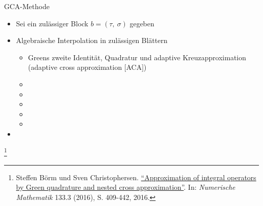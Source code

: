 \documentclass[10pt]{beamer}
\let\svthefootnote\thefootnote
\begin{document}
\begin{frame}{GCA-Methode}
  \begin{itemize}
    \item Sei ein zulässiger Block \(b = (\tau, \ \sigma)\) gegeben
    \item Algebraische Interpolation in zulässigen Blättern
    \begin{itemize}
      \item Greens zweite Identität, Quadratur und adaptive Kreuzapproximation
            (adaptive cross approximation [ACA])
      \item {}
      \item {}
      \item {}
      \item {}
      \item {}
    \end{itemize}
    \item {}
  \end{itemize}

  \footnotesize
  \let\thefootnote\relax\footnote{Steffen Börm und Sven Christophersen.
  \href{https://link.springer.com/article/10.1007\%2Fs00211-015-0757-y}{
  ``Approximation of integral operators by Green quadrature and nested cross 
  approximation''}. In: \textit{Numerische Mathematik} 133.3 (2016), S. 
  409-442, 2016.}
  \addtocounter{footnote}{-1}\let\thefootnote\svthefootnote\relax
  \normalsize
\end{frame}
\end{document}
